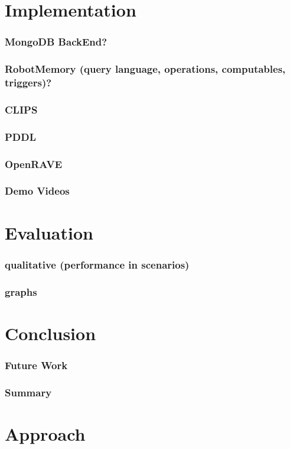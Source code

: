 \section{Implementation}
\begin{frame}
  \frametitle{MongoDB BackEnd?}
\end{frame}
\begin{frame}
  \frametitle{RobotMemory (query language, operations, computables, triggers)?}
\end{frame}
\begin{frame}
  \frametitle{CLIPS}
\end{frame}
\begin{frame}
  \frametitle{PDDL}
\end{frame}
\begin{frame}
  \frametitle{OpenRAVE}
\end{frame}
\begin{frame}
  \frametitle{Demo Videos}
\end{frame}
\section{Evaluation}
\begin{frame}
  \frametitle{qualitative (performance in scenarios)}
\end{frame}
\begin{frame}
  \frametitle{graphs}
\end{frame}
\section{Conclusion}
\begin{frame}
  \frametitle{Future Work}
\end{frame}
\begin{frame}
  \frametitle{Summary}
\end{frame}




\section{Approach}
